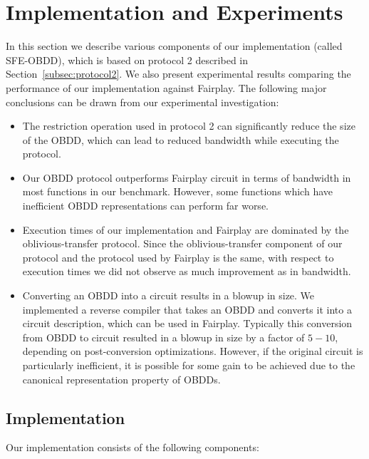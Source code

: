 \section{Implementation and Experiments}
\label{sec:experiments}

In this section we describe various components of our
implementation (called SFE-OBDD), which is based on protocol 2 described
in Section~\ref{subsec:protocol2}. We also present experimental results comparing the
performance of our implementation against Fairplay. 
The following major conclusions can be drawn from our experimental
investigation:
\begin{itemize}
\item The restriction operation used in protocol 2 can significantly
reduce the size of the OBDD, which can lead to reduced bandwidth while
executing the protocol. 

\item Our OBDD protocol outperforms Fairplay circuit in terms of
bandwidth in most functions in our benchmark.  However, some functions which
have inefficient OBDD representations can perform far worse.

\item Execution times of our implementation and Fairplay are dominated
by the oblivious-transfer protocol. Since the oblivious-transfer
component of our protocol and the protocol used by Fairplay is the
same, with respect to execution times we did not observe as much
improvement as in bandwidth.  

\item Converting an OBDD into a circuit  results in a 
blowup in size. We implemented a reverse compiler that takes an OBDD and
converts it into a circuit description, which can be used in Fairplay.
Typically this conversion from OBDD to circuit resulted in a
blowup in size by a factor of $5-10$, depending on post-conversion
optimizations.  However, if the original circuit is particularly inefficient, 
it is possible for some gain to be achieved due to the canonical 
representation property of OBDDs.

\end{itemize}

\subsection{Implementation}
Our implementation consists of the following components:

